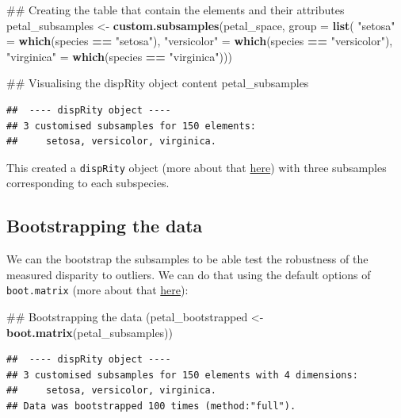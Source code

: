 \documentclass[]{book}
\newenvironment{Shaded}{\begin{snugshade}}{\end{snugshade}}
\newcommand{\KeywordTok}[1]{\textcolor[rgb]{0.13,0.29,0.53}{\textbf{#1}}}
\newcommand{\DataTypeTok}[1]{\textcolor[rgb]{0.13,0.29,0.53}{#1}}
\newcommand{\StringTok}[1]{\textcolor[rgb]{0.31,0.60,0.02}{#1}}
\newcommand{\OperatorTok}[1]{\textcolor[rgb]{0.81,0.36,0.00}{\textbf{#1}}}
\newcommand{\NormalTok}[1]{#1}
\theoremstyle{definition}
\theoremstyle{definition}
\theoremstyle{remark}
\begin{document}
\begin{Shaded}
\begin{Highlighting}[]
\NormalTok{## Creating the table that contain the elements and their attributes}
\NormalTok{petal_subsamples <-}\StringTok{ }\KeywordTok{custom.subsamples}\NormalTok{(petal_space, }\DataTypeTok{group =} \KeywordTok{list}\NormalTok{(}
                                \StringTok{"setosa"}\NormalTok{ =}\StringTok{ }\KeywordTok{which}\NormalTok{(species }\OperatorTok{==}\StringTok{ "setosa"}\NormalTok{),}
                                \StringTok{"versicolor"}\NormalTok{ =}\StringTok{ }\KeywordTok{which}\NormalTok{(species }\OperatorTok{==}\StringTok{ "versicolor"}\NormalTok{),}
                                \StringTok{"virginica"}\NormalTok{ =}\StringTok{ }\KeywordTok{which}\NormalTok{(species }\OperatorTok{==}\StringTok{ "virginica"}\NormalTok{)))}

\NormalTok{## Visualising the dispRity object content}
\NormalTok{petal_subsamples}
\end{Highlighting}
\end{Shaded}

\begin{verbatim}
##  ---- dispRity object ---- 
## 3 customised subsamples for 150 elements:
##     setosa, versicolor, virginica.
\end{verbatim}

This created a \texttt{dispRity} object (more about that
\protect\hyperlink{guts}{here}) with three subsamples corresponding to
each subspecies.

\subsection{Bootstrapping the data}\label{bootstrapping-the-data-1}

We can the bootstrap the subsamples to be able test the robustness of
the measured disparity to outliers. We can do that using the default
options of \texttt{boot.matrix} (more about that
\protect\hyperlink{bootstraps-and-rarefactions}{here}):

\begin{Shaded}
\begin{Highlighting}[]
\NormalTok{## Bootstrapping the data}
\NormalTok{(petal_bootstrapped <-}\StringTok{ }\KeywordTok{boot.matrix}\NormalTok{(petal_subsamples))}
\end{Highlighting}
\end{Shaded}

\begin{verbatim}
##  ---- dispRity object ---- 
## 3 customised subsamples for 150 elements with 4 dimensions:
##     setosa, versicolor, virginica.
## Data was bootstrapped 100 times (method:"full").
\end{verbatim}
\end{document}
